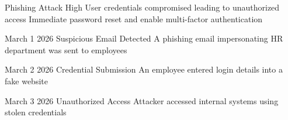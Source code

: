 \newthreat
{Phishing Attack}
{High}
{User credentials compromised leading to unauthorized access}
{Immediate password reset and enable multi-factor authentication}

\attacktimeline
{March 1 2026}
{Suspicious Email Detected}
{A phishing email impersonating HR department was sent to employees}

\attacktimeline
{March 2 2026}
{Credential Submission}
{An employee entered login details into a fake website}

\attacktimeline
{March 3 2026}
{Unauthorized Access}
{Attacker accessed internal systems using stolen credentials}


\attackdiagram

